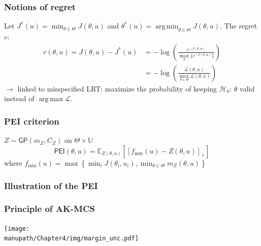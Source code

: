 \documentclass[11pt]{beamer}
\newcommand{\Ex}{\mathbb{E}}
\newcommand{\GP}{\mathsf{GP}}
\DeclareMathOperator*{\argmin}{arg\,min}
\DeclareMathOperator*{\argmax}{arg\,max}
\newcommand{\kk}{\theta}
\newcommand{\uu}{u}
\newcommand{\Uspace}{\mathbb{U}}
\newcommand{\Kspace}{\Theta}
\newcommand\manupath{/home/victor/acadwriting/Manuscrit/Text/}
\begin{document}
\begin{frame}
  \frametitle{Notions of regret}
  Let $J^*(\uu) = \min_{\kk \in \Kspace} J(\kk, \uu)$ and $\kk^*(\uu) = \argmin_{\kk\in\Kspace} J(\kk, \uu)$.
  The regret $r$:
  \begin{align}
    r(\kk, \uu) = J(\kk, \uu) - J^*(\uu) &= -\log \left(\frac{e^{-J(\kk, \uu)}}{\max_{\kk}\{   e^{-J(\kk, \uu)}\}}\right) \\
                                         &= - \log \left(\frac{\mathcal{L}(\kk, \uu)}{\max_{\kk\in\Kspace} \mathcal{L}(\kk, \uu)}\right)
  \end{align}
  $\rightarrow$ linked to misspecified LRT: maximize the probability of keeping $\mathcal{H}_0$: $\kk$ valid instead of $\argmax \mathcal{L}$.
\end{frame}
\begin{frame}
  \frametitle{PEI criterion}
  $Z \sim \GP(m_Z, C_Z)$ on $\Kspace \times \Uspace$
  \begin{equation}
    \mathsf{PEI}(\kk, \uu) = \Ex_{Z(\kk, \uu)}\left[ \left[f_{\min}(\uu) - Z(\kk, \uu)\right]_+\right]
  \end{equation}
where $f_{\min}(\uu) = \max\left\{\min_i J(\kk_i, \uu_i), \min_{\kk\in\Kspace} m_Z(\kk, \uu)\right\}$

\end{frame}
\begin{frame}
  \frametitle{Illustration of the PEI}
  \resizebox{\textwidth}{!}{
    
    }
\end{frame}

\begin{frame}
  \frametitle{Principle of AK-MCS}
    \texttt{[image: \\manupath/Chapter4/img/margin\_unc.pdf]}
\end{frame}
\end{document}
